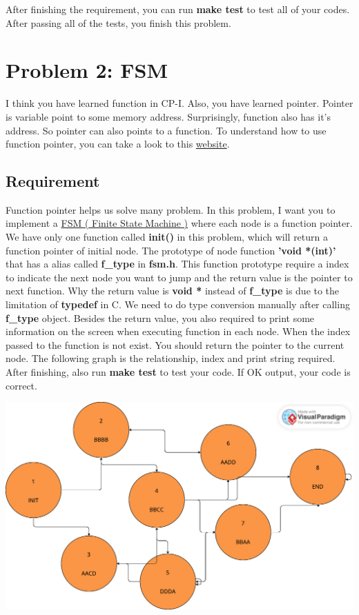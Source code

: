 \documentclass{report}
\begin{document}
After finishing the requirement, you can run \textbf{make test} to test all of
your codes.
After passing all of the tests, you finish this problem.

\section{Problem 2: FSM}

I think you have learned function in CP-I. Also, you have learned pointer. Pointer is
variable point to some memory address. Surprisingly, function also has it's
address. So pointer can also points to a function. To understand how to use
function pointer, you can take a look to
this
\href{https://chenhh.gitbooks.io/parallel_processing/content/cython/function_pointer.html}{website}.

\subsection{Requirement}

Function pointer helps us solve many problem. In this problem, I want you to implement a
\href{https://zh.wikipedia.org/zh-tw/%E6%9C%89%E9%99%90%E7%8A%B6%E6%80%81%E6%9C%BA}{FSM
  ( Finite State Machine )} where each node is a function pointer.
We have only one function called \textbf{init()} in this problem, which will
return a function pointer of initial node. The prototype of node function 
\textbf{'void *(int)'} that has a alias called \textbf{f\_type} in
\textbf{fsm.h}. This function prototype require a index to indicate the next
node you want to jump and the return
value is the pointer to next function. Why the return value is \textbf{void *}
instead of \textbf{f\_type} is due to the limitation of \textbf{typedef} in C.
We need to do type conversion manually after calling \textbf{f\_type} object.
Besides the return value, you also required to print some information on the
screen when executing function in each node. When the index passed to the
function is not exist. You should return the pointer to the current node.
The following graph is the relationship, index and print string required. After
finishing, also run \textbf{make test} to test your code. If OK output,
your code is correct.


\includegraphics[scale=0.23]{graph}
\end{document}
